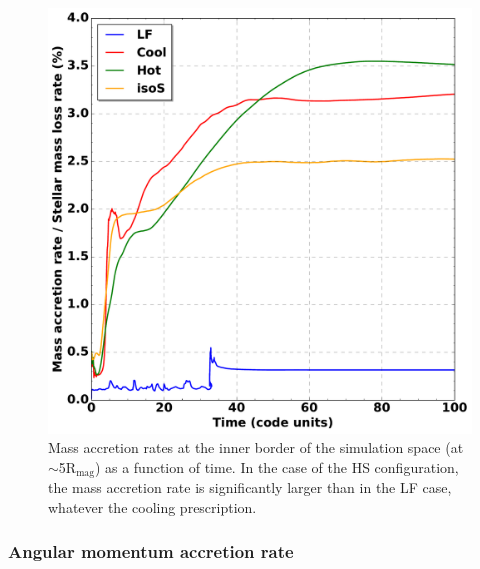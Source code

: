 \documentclass{aa}
\begin{document}
\begin{figure}
\centering
\includegraphics[width=0.95\columnwidth]{Pictures/mdot_time.pdf}
\caption{Mass accretion rates at the inner border of the simulation space (at $\sim$5R$_{\text{mag}}$) as a function of time. In the case of the HS configuration, the mass accretion rate is significantly larger than in the LF case, whatever the cooling prescription.}
\label{fig:mdot_time}
\end{figure} 

%
%


\subsubsection{Angular momentum accretion rate}
\label{sec:ldot}
\end{document}
